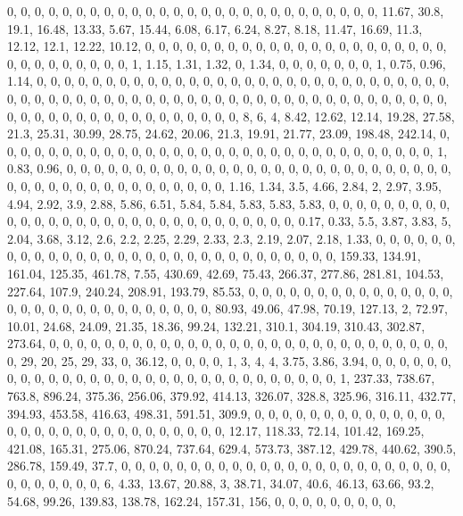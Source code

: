 \documentclass[
]{article}
\begin{document}
0, 0, 0, 0, 0, 0, 0, 0, 0, 0, 0, 0, 0, 0, 0, 0, 0, 0, 0, 0, 0, 0, 0, 0,
0, 0, 0, 11.67, 30.8, 19.1, 16.48, 13.33, 5.67, 15.44, 6.08, 6.17, 6.24,
8.27, 8.18, 11.47, 16.69, 11.3, 12.12, 12.1, 12.22, 10.12, 0, 0, 0, 0,
0, 0, 0, 0, 0, 0, 0, 0, 0, 0, 0, 0, 0, 0, 0, 0, 0, 0, 0, 0, 0, 0, 0, 0,
0, 0, 0, 1, 1.15, 1.31, 1.32, 0, 1.34, 0, 0, 0, 0, 0, 0, 0, 1, 0.75,
0.96, 1.14, 0, 0, 0, 0, 0, 0, 0, 0, 0, 0, 0, 0, 0, 0, 0, 0, 0, 0, 0, 0,
0, 0, 0, 0, 0, 0, 0, 0, 0, 0, 0, 0, 0, 0, 0, 0, 0, 0, 0, 0, 0, 0, 0, 0,
0, 0, 0, 0, 0, 0, 0, 0, 0, 0, 0, 0, 0, 0, 0, 0, 0, 0, 0, 0, 0, 0, 0, 0,
0, 0, 0, 0, 0, 0, 0, 0, 0, 0, 0, 8, 6, 4, 8.42, 12.62, 12.14, 19.28,
27.58, 21.3, 25.31, 30.99, 28.75, 24.62, 20.06, 21.3, 19.91, 21.77,
23.09, 198.48, 242.14, 0, 0, 0, 0, 0, 0, 0, 0, 0, 0, 0, 0, 0, 0, 0, 0,
0, 0, 0, 0, 0, 0, 0, 0, 0, 0, 0, 0, 0, 0, 0, 0, 1, 0.83, 0.96, 0, 0, 0,
0, 0, 0, 0, 0, 0, 0, 0, 0, 0, 0, 0, 0, 0, 0, 0, 0, 0, 0, 0, 0, 0, 0, 0,
0, 0, 0, 0, 0, 0, 0, 0, 0, 0, 0, 0, 0, 0, 0, 0, 0, 1.16, 1.34, 3.5,
4.66, 2.84, 2, 2.97, 3.95, 4.94, 2.92, 3.9, 2.88, 5.86, 6.51, 5.84,
5.84, 5.83, 5.83, 5.83, 0, 0, 0, 0, 0, 0, 0, 0, 0, 0, 0, 0, 0, 0, 0, 0,
0, 0, 0, 0, 0, 0, 0, 0, 0, 0, 0, 0, 0, 0, 0.17, 0.33, 5.5, 3.87, 3.83,
5, 2.04, 3.68, 3.12, 2.6, 2.2, 2.25, 2.29, 2.33, 2.3, 2.19, 2.07, 2.18,
1.33, 0, 0, 0, 0, 0, 0, 0, 0, 0, 0, 0, 0, 0, 0, 0, 0, 0, 0, 0, 0, 0, 0,
0, 0, 0, 0, 0, 0, 0, 0, 159.33, 134.91, 161.04, 125.35, 461.78, 7.55,
430.69, 42.69, 75.43, 266.37, 277.86, 281.81, 104.53, 227.64, 107.9,
240.24, 208.91, 193.79, 85.53, 0, 0, 0, 0, 0, 0, 0, 0, 0, 0, 0, 0, 0, 0,
0, 0, 0, 0, 0, 0, 0, 0, 0, 0, 0, 0, 0, 0, 0, 0, 80.93, 49.06, 47.98,
70.19, 127.13, 2, 72.97, 10.01, 24.68, 24.09, 21.35, 18.36, 99.24,
132.21, 310.1, 304.19, 310.43, 302.87, 273.64, 0, 0, 0, 0, 0, 0, 0, 0,
0, 0, 0, 0, 0, 0, 0, 0, 0, 0, 0, 0, 0, 0, 0, 0, 0, 0, 0, 0, 0, 0, 29,
20, 25, 29, 33, 0, 36.12, 0, 0, 0, 0, 1, 3, 4, 4, 3.75, 3.86, 3.94, 0,
0, 0, 0, 0, 0, 0, 0, 0, 0, 0, 0, 0, 0, 0, 0, 0, 0, 0, 0, 0, 0, 0, 0, 0,
0, 0, 0, 0, 0, 1, 237.33, 738.67, 763.8, 896.24, 375.36, 256.06, 379.92,
414.13, 326.07, 328.8, 325.96, 316.11, 432.77, 394.93, 453.58, 416.63,
498.31, 591.51, 309.9, 0, 0, 0, 0, 0, 0, 0, 0, 0, 0, 0, 0, 0, 0, 0, 0,
0, 0, 0, 0, 0, 0, 0, 0, 0, 0, 0, 0, 0, 0, 12.17, 118.33, 72.14, 101.42,
169.25, 421.08, 165.31, 275.06, 870.24, 737.64, 629.4, 573.73, 387.12,
429.78, 440.62, 390.5, 286.78, 159.49, 37.7, 0, 0, 0, 0, 0, 0, 0, 0, 0,
0, 0, 0, 0, 0, 0, 0, 0, 0, 0, 0, 0, 0, 0, 0, 0, 0, 0, 0, 0, 0, 0, 6,
4.33, 13.67, 20.88, 3, 38.71, 34.07, 40.6, 46.13, 63.66, 93.2, 54.68,
99.26, 139.83, 138.78, 162.24, 157.31, 156, 0, 0, 0, 0, 0, 0, 0, 0, 0,
\end{document}

